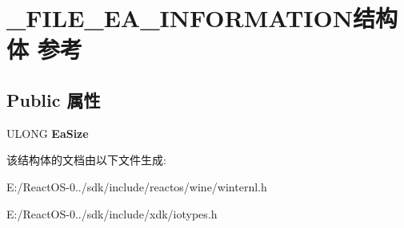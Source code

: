 \hypertarget{struct___f_i_l_e___e_a___i_n_f_o_r_m_a_t_i_o_n}{}\section{\+\_\+\+F\+I\+L\+E\+\_\+\+E\+A\+\_\+\+I\+N\+F\+O\+R\+M\+A\+T\+I\+O\+N结构体 参考}
\label{struct___f_i_l_e___e_a___i_n_f_o_r_m_a_t_i_o_n}
\subsection*{Public 属性}
\begin{DoxyCompactItemize}
\item 
\mbox{\label{struct___f_i_l_e___e_a___i_n_f_o_r_m_a_t_i_o_n_a3c14accd1074e169c150f8dc753a1c51}} 
U\+L\+O\+NG {\bfseries Ea\+Size}
\end{DoxyCompactItemize}


该结构体的文档由以下文件生成\+:\begin{DoxyCompactItemize}
\item 
E\+:/\+React\+O\+S-\/0../sdk/include/reactos/wine/winternl.\+h\item 
E\+:/\+React\+O\+S-\/0../sdk/include/xdk/iotypes.\+h\end{DoxyCompactItemize}
